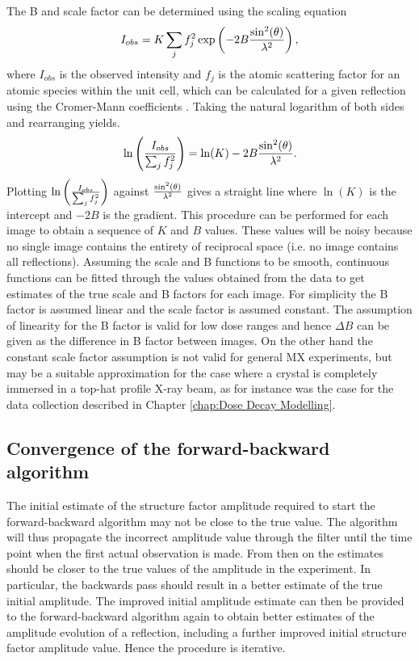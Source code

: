 The B and scale factor can be determined using the scaling equation
\begin{equation}
    I_{obs} = K \sum_j f_j^2 \exp\left(-2B \frac{\sin^2(\theta)}{\lambda^2}\right),
    \label{eq:Scaling observation model}
\end{equation}
where $I_{obs}$ is the observed intensity and $f_j$ is the atomic scattering factor for an atomic species within the unit cell, which can be calculated for a given reflection using the Cromer-Mann coefficients \cite{cromer1968x}.
Taking the natural logarithm of both sides and rearranging yields.
\begin{equation}
    \ln \left( \frac{I_{obs}}{\sum_j f_j^2}\right) = \ln(K) - 2B \frac{\sin^2(\theta)}{\lambda^2}.
    \label{eq:Log of the scaling observation model}
\end{equation}
Plotting $\ln \left( \frac{I_{obs}}{\sum_j f_j^2}\right)$ against $ \frac{\sin^2(\theta)}{\lambda^2} $ gives a straight line where $\ln(K)$ is the intercept and $-2B$ is the gradient.
This procedure can be performed for each image to obtain a sequence of $K$ and $B$ values.
These values will be noisy because no single image contains the entirety of reciprocal space (i.e. no image contains all reflections).
Assuming the scale and B functions to be smooth, continuous functions can be fitted through the values obtained from the data to get estimates of the true scale and B factors for each image.
For simplicity the B factor is assumed linear and the scale factor is assumed constant.
The assumption of linearity for the B factor is valid for low dose ranges \cite{kmetko2006,borek2007many,leal2012} and hence $\Delta B$ can be given as the difference in B factor between images.
On the other hand the constant scale factor assumption is not valid for general MX experiments, but may be a suitable approximation for the case where a crystal is completely immersed in a top-hat profile X-ray beam, as for instance was the case for the data collection described in Chapter \ref{chap:Dose Decay Modelling}.

\subsection{Convergence of the forward-backward algorithm}
\label{sub:Convergence of the forward-backward algorithm}
The initial estimate of the structure factor amplitude required to start the forward-backward algorithm may not be close to the true value.
The algorithm will thus propagate the incorrect amplitude value through the filter until the time point when the first actual observation is made.
From then on the estimates should be closer to the true values of the amplitude in the experiment.
In particular, the backwards pass should result in a better estimate of the true initial amplitude.
The improved initial amplitude estimate can then be provided to the forward-backward algorithm again to obtain better estimates of the amplitude evolution of a reflection, including a further improved initial structure factor amplitude value.
Hence the procedure is iterative.

